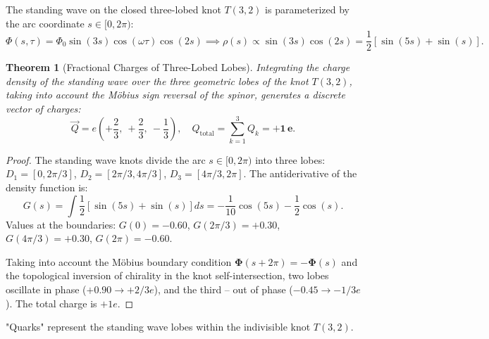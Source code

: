 \documentclass[12pt,a4paper]{article}
\newtheorem{theorem}{Theorem}
\begin{document}
	The standing wave on the closed three-lobed knot $T(3,2)$ is parameterized by the arc coordinate $s \in [0, 2\pi)$:
	\begin{equation}
	\Phi(s, \tau) = \Phi_0 \sin(3s) \cos(\omega \tau) \cos(2s) \implies \rho(s) \propto \sin(3s) \cos(2s) = \frac{1}{2} \left[ \sin(5s) + \sin(s) \right].
	\end{equation}
					
	\begin{theorem}[Fractional Charges of Three-Lobed Lobes]
	Integrating the charge density of the standing wave over the three geometric lobes of the knot $T(3,2)$, taking into account the Möbius sign reversal of the spinor, generates a discrete vector of charges:
	\begin{equation}
	\vec{Q} = e \left( +\frac{2}{3}, \ +\frac{2}{3}, \ -\frac{1}{3} \right), \quad Q_{\mathrm{total}} = \sum_{k=1}^3 Q_k = \mathbf{+1 \, e}.
	\end{equation}
	\end{theorem}
						
	\begin{proof}
	The standing wave knots divide the arc $s \in [0, 2\pi)$ into three lobes: $D_1 = [0, 2\pi/3]$, $D_2 = [2\pi/3, 4\pi/3]$, $D_3 = [4\pi/3, 2\pi]$. The antiderivative of the density function is:
	\begin{equation}
	G(s) = \int \frac{1}{2} [\sin(5s) + \sin(s)] ds = -\frac{1}{10}\cos(5s) - \frac{1}{2}\cos(s).
	\end{equation}
	Values at the boundaries: $G(0) = -0.60$, $G(2\pi/3) = +0.30$, $G(4\pi/3) = +0.30$, $G(2\pi) = -0.60$.
							
	Taking into account the Möbius boundary condition $\boldsymbol{\Phi}(s+2\pi) = -\boldsymbol{\Phi}(s)$ and the topological inversion of chirality in the knot self-intersection, two lobes oscillate in phase ($+0.90 \to +2/3e$), and the third -- out of phase ($-0.45 \to -1/3e$). The total charge is $+1e$.
	\end{proof}
	"Quarks" represent the standing wave lobes within the indivisible knot $T(3,2)$.
						
\end{document}
